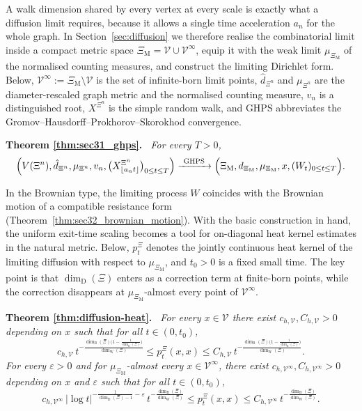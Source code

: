 \documentclass{article}
\newenvironment{restated}[1]{%
  \par\noindent\textbf{Theorem #1.}\itshape\ }%
  {\par}
\theoremstyle{plain}
\theoremstyle{definition}
\newcommand{\dimbox}{\dim_\mathrm{B}}
\newcommand{\dimdeg}{\dim_\mathrm{D}}
\newcommand{\dimwalk}{\dim_\mathrm{W}}
\begin{document}
A walk dimension shared by every vertex at every scale is exactly what a diffusion limit requires, because it allows a single time acceleration $a_n$ for the whole graph.
In Section~\ref{sec:diffusion} we therefore realise the combinatorial limit inside a compact metric space $\Xi_{\mathrm M}=\mathscr V\cup\mathscr V^\infty$, equip it with the weak limit $\mu_{\Xi_{\mathrm M}}$ of the normalised counting measures, and construct the limiting Dirichlet form.
Below, $\mathscr V^\infty:=\Xi_{\mathrm M}\setminus\mathscr V$ is the set of infinite-born limit points, $\hat d_{\Xi^n}$ and $\mu_{\Xi^n}$ are the diameter-rescaled graph metric and the normalised counting measure, $v_n$ is a distinguished root, $X^{\Xi^n}$ is the simple random walk, and GHPS abbreviates the Gromov--Hausdorff--Prokhorov--Skorokhod convergence.

\begin{restated}{\ref{thm:sec31_ghps}}
For every $T>0$,
\[
\Bigl(V(\Xi^n),\hat d_{\Xi^n},\mu_{\Xi^n},v_n,\bigl(X^{\Xi^n}_{\lfloor a_nt\rfloor}\bigr)_{0\le t\le T}\Bigr)
\xrightarrow{\ \mathrm{GHPS}\ }
\Bigl(\Xi_{\mathrm M},d_{\Xi_{\mathrm M}},\mu_{\Xi_{\mathrm M}},x,(W_t)_{0\le t\le T}\Bigr).
\]
\end{restated}

In the Brownian type, the limiting process $W$ coincides with the Brownian motion of a compatible resistance form (Theorem~\ref{thm:sec32_brownian_motion}).
With the basic construction in hand, the uniform exit-time scaling becomes a tool for on-diagonal heat kernel estimates in the natural metric.
Below, $p_t^\Xi$ denotes the jointly continuous heat kernel of the limiting diffusion with respect to $\mu_{\Xi_{\mathrm M}}$, and $t_0>0$ is a fixed small time.
The key point is that $\dimdeg(\Xi)$ enters as a correction term at finite-born points, while the correction disappears at $\mu_{\Xi_{\mathrm M}}$-almost every point of $\mathscr V^\infty$.

\begin{restated}{\ref{thm:diffusion-heat}}
For every $x\in\mathscr V$ there exist $c_{h,\mathscr V},C_{h,\mathscr V}>0$ depending on $x$ such that for all $t\in(0,t_0)$,
\[
c_{h,\mathscr V}\, t^{-\frac{\dimbox(\Xi)\bigl(1-\frac{1}{\dimdeg(\Xi)}\bigr)}{\dimwalk(\Xi)}}
\le
p_t^{\Xi}(x,x)
\le
C_{h,\mathscr V}\, t^{-\frac{\dimbox(\Xi)\bigl(1-\frac{1}{\dimdeg(\Xi)}\bigr)}{\dimwalk(\Xi)}}.
\]
For every $\varepsilon>0$ and for $\mu_{\Xi_{\mathrm M}}$-almost every $x\in\mathscr V^\infty$, there exist $c_{h,\mathscr V^\infty},C_{h,\mathscr V^\infty}>0$ depending on $x$ and $\varepsilon$ such that for all $t\in(0,t_0)$,
\[
c_{h,\mathscr V^\infty}\,
|\log t|^{-\frac{1}{\dimdeg(\Xi)-1}-\varepsilon}\,
t^{-\frac{\dimbox(\Xi)}{\dimwalk(\Xi)}}
\le
p_t^{\Xi}(x,x)
\le
C_{h,\mathscr V^\infty}\,
t^{-\frac{\dimbox(\Xi)}{\dimwalk(\Xi)}}.
\]
\end{restated}
\end{document}
